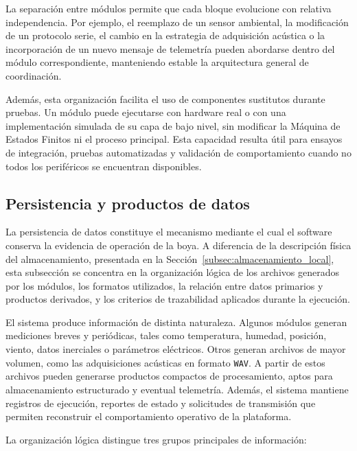 La separación entre módulos permite que cada bloque evolucione con relativa independencia. Por ejemplo, el reemplazo de un sensor ambiental, la modificación de un protocolo serie, el cambio en la estrategia de adquisición acústica o la incorporación de un nuevo mensaje de telemetría pueden abordarse dentro del módulo correspondiente, manteniendo estable la arquitectura general de coordinación.

Además, esta organización facilita el uso de componentes sustitutos durante pruebas. Un módulo puede ejecutarse con hardware real o con una implementación simulada de su capa de bajo nivel, sin modificar la Máquina de Estados Finitos ni el proceso principal. Esta capacidad resulta útil para ensayos de integración, pruebas automatizadas y validación de comportamiento cuando no todos los periféricos se encuentran disponibles.

\subsection{Persistencia y productos de datos}
\label{subsec:persistencia_productos_datos}

La persistencia de datos constituye el mecanismo mediante el cual el software conserva la evidencia de operación de la boya. A diferencia de la descripción física del almacenamiento, presentada en la Sección~\ref{subsec:almacenamiento_local}, esta subsección se concentra en la organización lógica de los archivos generados por los módulos, los formatos utilizados, la relación entre datos primarios y productos derivados, y los criterios de trazabilidad aplicados durante la ejecución.

El sistema produce información de distinta naturaleza. Algunos módulos generan mediciones breves y periódicas, tales como temperatura, humedad, posición, viento, datos inerciales o parámetros eléctricos. Otros generan archivos de mayor volumen, como las adquisiciones acústicas en formato \texttt{WAV}. A partir de estos archivos pueden generarse productos compactos de procesamiento, aptos para almacenamiento estructurado y eventual telemetría. Además, el sistema mantiene registros de ejecución, reportes de estado y solicitudes de transmisión que permiten reconstruir el comportamiento operativo de la plataforma.

La organización lógica distingue tres grupos principales de información:

